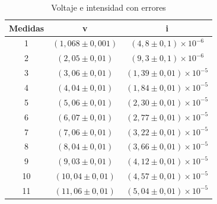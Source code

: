 \begin{table}[h]
\centering
\begin{tabular}{|c|c|c|}
\hline
Medidas & v & i \\
\hline
1 & $(1,068 \pm 0,001)$ & $(4,8 \pm 0,1) \times 10^{-6}$ \\
2 & $(2,05 \pm 0,01)$ & $(9,3 \pm 0,1) \times 10^{-6}$ \\
3 & $(3,06 \pm 0,01)$ & $(1,39 \pm 0,01) \times 10^{-5}$ \\
4 & $(4,04 \pm 0,01)$ & $(1,84 \pm 0,01) \times 10^{-5}$ \\
5 & $(5,06 \pm 0,01)$ & $(2,30 \pm 0,01) \times 10^{-5}$ \\
6 & $(6,07 \pm 0,01)$ & $(2,77 \pm 0,01) \times 10^{-5}$ \\
7 & $(7,06 \pm 0,01)$ & $(3,22 \pm 0,01) \times 10^{-5}$ \\
8 & $(8,04 \pm 0,01)$ & $(3,66 \pm 0,01) \times 10^{-5}$ \\
9 & $(9,03 \pm 0,01)$ & $(4,12 \pm 0,01) \times 10^{-5}$ \\
10 & $(10,04 \pm 0,01)$ & $(4,57 \pm 0,01) \times 10^{-5}$ \\
11 & $(11,06 \pm 0,01)$ & $(5,04 \pm 0,01) \times 10^{-5}$ \\
\hline
\end{tabular}
\caption{Voltaje e intensidad con errores}
\label{tab:VI}
\end{table}